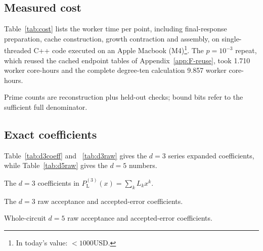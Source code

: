 \subsection{Measured cost}
Table~\ref{tab:cost} lists the worker time per point, including final-response preparation, cache construction, growth contraction and assembly, on single-threaded C++ code executed on an Apple Macbook (M4)\footnote{In today's value: $<1000\text{USD}$.}. The $p=10^{-3}$ repeat, which reused the cached endpoint tables of Appendix~\ref{app:F-reuse}, took 1.710 worker core-hours and the complete degree-ten calculation 9.857 worker core-hours.

{\color{black}
\begin{table}[b]\centering\small
\captionsetup{position=above,skip=4pt}
\caption{Prime counts are reconstruction plus held-out checks; bound bits refer to the sufficient full denominator.}
\label{tab:cost}
\begin{adjustbox}{max width=\linewidth}\end{adjustbox}
\end{table}}

\subsection{Exact coefficients}
Table~\ref{tab:d3coeff} and ~\ref{tab:d3raw} gives the $d=3$ series expanded coefficients, while Table~\ref{tab:d5raw} gives the $d=5$ numbers.
\begin{table}[H]\centering\small
\captionsetup{position=above,skip=4pt}
\caption{The $d=3$ coefficients in $P^{(3)}_\text{L}(x)=\sum_kL_kx^k$.}
\label{tab:d3coeff}

\end{table}

\begin{table}[p]\centering\small
\captionsetup{position=above,skip=4pt}
\caption{The $d=3$ raw acceptance and accepted-error coefficients.}
\label{tab:d3raw}
\begin{minipage}[t]{.48\linewidth}\centering

\end{minipage}\hfill
\begin{minipage}[t]{.48\linewidth}\centering

\end{minipage}
\end{table}

\begin{table}[p]\centering\small
\captionsetup{position=above,skip=4pt}
\caption{Whole-circuit $d=5$ raw acceptance and accepted-error coefficients.}
\label{tab:d5raw}
\begin{minipage}[t]{.48\linewidth}\centering

\end{minipage}\hfill
\begin{minipage}[t]{.48\linewidth}\centering

\end{minipage}
\end{table}
